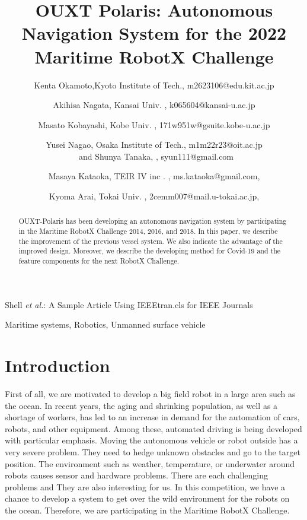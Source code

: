\documentclass[lettersize,journal]{IEEEtran}
\begin{document}
\title{OUXT Polaris: Autonomous Navigation System for the 2022 Maritime RobotX Challenge}
\author{
    Kenta Okamoto,Kyoto Institute of Tech., m2623106@edu.kit.ac.jp \\ \and
    Akihisa Nagata, Kansai Univ. , k065604@kansai-u.ac.jp \\ \and
    Masato Kobayashi, Kobe Univ. , 171w951w@gsuite.kobe-u.ac.jp \\ \and
    Yusei Nagao, Osaka Institute of Tech., m1m22r23@oit.ac.jp \\ \ and
    Shunya Tanaka, , syun111@gmail.com \\ \and
    Masaya Kataoka, TEIR IV inc . , ms.kataoka@gmail.com, \\ \and
    Kyoma Arai, Tokai Univ. , 2cemm007@mail.u-tokai.ac.jp,
}

%
{Shell \MakeLowercase{\textit{et al.}}: A Sample Article Using IEEEtran.cls for IEEE Journals}


\maketitle

\begin{abstract}
OUXT-Polaris has been developing an autonomous navigation system by participating in the 
Maritime RobotX Challenge 2014, 2016, and 2018. 
In this paper, we describe the improvement of the previous vessel system. 
We also indicate the advantage of the improved design.
Moreover, we describe the developing method for Covid-19 and the 
feature components for the next RobotX Challenge.
\end{abstract}

\begin{IEEEkeywords}
Maritime systems, Robotics, Unmanned surface vehicle
\end{IEEEkeywords}

\section{Introduction}
First of all, we are motivated to develop a big field robot in a large area such as the ocean.
In recent years, the aging and shrinking population, as well as a shortage of workers,
has led to an increase in demand for the automation of cars, robots, and other equipment.
Among these, automated driving is being developed with particular emphasis.
Moving the autonomous vehicle or robot outside has a very severe problem.
They need to hedge unknown obstacles and go to the target position.
The environment such as weather, temperature, or underwater around robots causes sensor and hardware problems.
There are each challenging problems and They are also interesting for us.  
In this competition, we have a chance to develop a system to get over the wild environment 
for the robots on the ocean. Therefore, we are participating in the Maritime RobotX Challenge.
\end{document}
